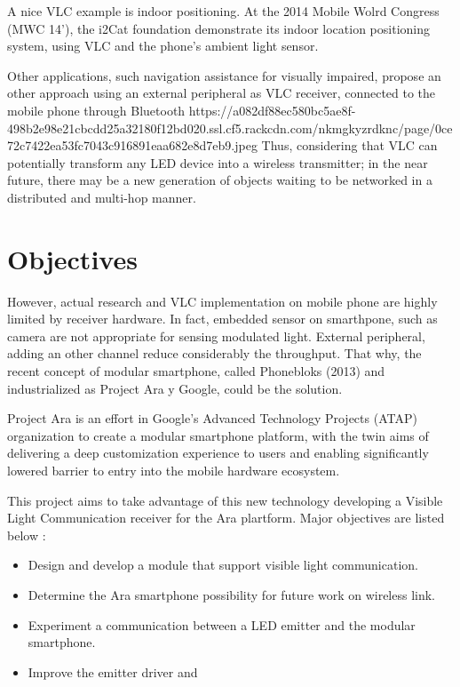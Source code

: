 A nice VLC example is indoor positioning. At the 2014 Mobile Wolrd Congress (MWC 14'), the i2Cat foundation demonstrate its indoor location positioning system, using VLC and the phone's ambient light sensor.

Other applications, such navigation assistance for visually impaired, propose an other approach using an external peripheral as VLC receiver, connected to the mobile phone through Bluetooth \citep{bluereceiver}
https://a082df88ec580bc5ae8f-498b2e98e21cbcdd25a32180f12bd020.ssl.cf5.rackcdn.com/nkmgkyzrdknc/page/0ce72c7422ea53fc7043c916891eaa682e8d7eb9.jpeg
Thus, considering that VLC can potentially transform any LED device into a wireless transmitter; in the near future, there may be a new generation of objects waiting to be networked in a distributed and multi-hop manner.



\section{Objectives}
However, actual research and VLC implementation on mobile phone are highly limited by receiver hardware. In fact, embedded sensor on smarthpone, such as camera are not appropriate for sensing modulated light. External peripheral, adding an other channel reduce considerably the throughput.
That why, the recent concept of modular smartphone, called Phonebloks (2013) and industrialized as Project Ara y Google, could be the solution.

Project Ara is an effort in Google's Advanced Technology Projects (ATAP) organization to create a modular smartphone platform, with the twin aims of delivering a deep customization experience to users and enabling significantly lowered barrier to entry into the mobile hardware ecosystem.

This project aims to take advantage of this new technology developing a Visible Light Communication receiver for the Ara plartform. Major objectives are listed below :
\begin{itemize}
\item Design and develop a module that support visible light communication.
\item Determine the Ara smartphone possibility for future work on wireless link.
\item Experiment a communication between a LED emitter and the modular smartphone.
\item Improve the emitter driver and 
\end{itemize}


